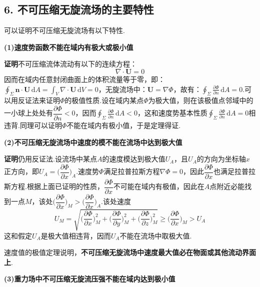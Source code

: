 \subsection*{6. 不可压缩无旋流场的主要特性}

可以证明不可压缩无旋流场有以下特性.

\textbf{(1)速度势函数不能在域内有极大或极小值}

\textbf{证明}\quad 不可压缩流体流动有以下的连续方程：
\[
\nabla\cdot\boldsymbol{U}=0
\]
因而在域内任意封闭曲面上的体积流量等于零，即：$\displaystyle\oint_\Sigma\boldsymbol{n}\cdot\boldsymbol{U}\,\mathrm{d}A=\int_V\nabla\cdot\boldsymbol{U}\,\mathrm{d}V=0$，无旋流场中：$\boldsymbol{U}=\nabla\Phi$，故有：$\displaystyle\oint_\Sigma\frac{\partial\Phi}{\partial n}\,\mathrm{d}A=0$.可以用反证法来证明$\Phi$的极值性质.设在域内某点$\Phi$为极大值，则在该极值点邻域中的一小球上处处有$\dfrac{\partial\Phi}{\partial n}<0$，因而$\displaystyle\oint_\Sigma\frac{\partial\Phi}{\partial n}\,\mathrm{d}A<0$，这和速度势基本性质$\displaystyle\oint_\Sigma\frac{\partial\Phi}{\partial n}\,\mathrm{d}A=0$相违背.同理可以证明$\Phi$不能在域内有极小值，于是定理得证.

\textbf{(2)不可压缩无旋流场中速度的模不能在流场中达到极大值}

\textbf{证明}\quad 仍用反证法.设流场中某点$A$的速度模达到极大值$U_A$，且$U_A$的方向为坐标轴$x$正方向，即$U_A=\Big(\dfrac{\partial\Phi}{\partial x}\Big)_A$.速度势$\Phi$满足拉普拉斯方程$\nabla\Phi=0$，因此$\dfrac{\partial\Phi}{\partial x}$也满足拉普拉斯方程.根据上面已证明的性质，$\dfrac{\partial\Phi}{\partial x}$不可能在域内有极值，因此在$A$点附近必能找到一点$M$，该处$\Big(\dfrac{\partial\Phi}{\partial x}\Big)_M>\Big(\dfrac{\partial\Phi}{\partial x}\Big)_A$.该处速度
\[
U_M=\sqrt{\Big(\frac{\partial\Phi}{\partial x}\Big)_M^{2}+\Big(\frac{\partial\Phi}{\partial y}\Big)_M^{2}+\Big(\frac{\partial\Phi}{\partial z}\Big)_M^{2}}\geqslant\Big(\frac{\partial\Phi}{\partial x}\Big)_M>U_A
\]
这和假定$U_A$是极大值相违背，因而$U_A$不能在流场中取极大值.

速度值的极值定理说明，\textbf{不可压缩无旋流场中速度最大值必在物面或其他流动界面上}.

\textbf{(3)重力场中不可压缩无旋流压强不能在域内达到极小值}

